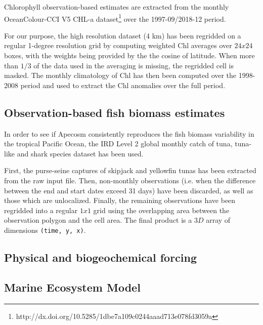 Chlorophyll observation-based estimates are extracted from the monthly OceanColour-CCI V5 CHL-a dataset\footnote{http://dx.doi.org/10.5285/1dbe7a109c0244aaad713e078fd3059a}  \citep{sathyendranathOceanColourTimeSeries2019} over the 1997-09/2018-12 period. 

For our purpose, the high resolution dataset (4 km) has been regridded on a regular 1-degree resolution grid by computing weighted Chl averages over $24x24$ boxes, with the weights being provided by the the cosine of latitude. When more than $1/3$ of the data used in the averaging is missing, the regridded cell is masked. The monthly climatology of Chl has then been computed over the 1998-2008 period and used to extract the Chl anomalies over the full period.

\subsection{Observation-based fish biomass estimates}

In order to see if Apecosm consistently reproduces the fish biomass variability in the tropical Pacific Ocean, the IRD Level 2 global monthly catch of tuna, tuna-like and shark species dataset \citep{taconetGlobalMonthlyCatch2018} has been used.

First, the purse-seine captures of skipjack and yellowfin tunas has been extracted from the raw input file. Then, non-monthly observations (i.e. when the difference between the end and start dates exceed 31 days) have been discarded, as well as those which are unlocalized. Finally, the remaining observations have been regridded into a regular $1x1$ grid using the overlapping area between the observation polygon and the cell area. The final product is a $3D$ array of dimensions \verb+(time, y, x)+.

\subsection{Physical and biogeochemical forcing}


\subsection{Marine Ecosystem Model}
